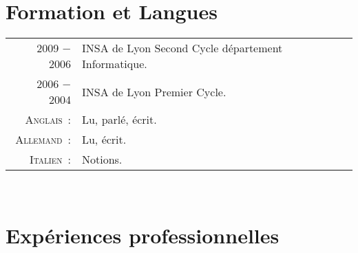 \documentclass[a4paper,10pt]{article}
\begin{document}
\section{Formation et Langues}
\begin{tabular}{rl}
  \textsc{2009 − 2006}  & INSA de Lyon Second Cycle département Informatique. \\
  \textsc{2006 − 2004}  & INSA de Lyon Premier Cycle. \\
  \textsc{Anglais :}    & Lu, parlé, écrit. \\
  \textsc{Allemand :}   & Lu, écrit. \\
  \textsc{Italien :}    & Notions. \\
\end{tabular} \\

\section{Expériences professionnelles}
\end{document}
